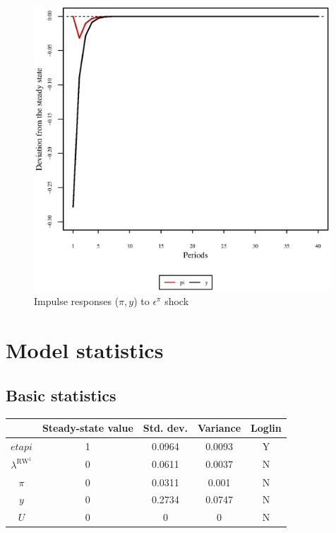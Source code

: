 \begin{figure}[h]
\centering
\begin{minipage}{0.5\textwidth}
\vspace*{-3em}
\centering
\includegraphics[width=0.99\textwidth, scale=0.55]{plots/plot_30.eps}
\caption{Impulse responses ($\pi, y$) to $\epsilon^{\pi}$ shock}
\end{minipage}
\end{figure}
\section{Model statistics}

\subsection{Basic statistics}

\begin{tabular}{c|c|c|c|c|}
  & Steady-state value & Std. dev. & Variance & Loglin\\
\hline
${e\!t\!a\!p\!i}$ & 1 & 0.0964 & 0.0093 & Y    \\
$\lambda^{\mathrm{RW}^{\mathrm{1}}}$ & 0 & 0.0611 & 0.0037 & N    \\
$\pi$ & 0 & 0.0311 & 0.001 & N    \\
$y$ & 0 & 0.2734 & 0.0747 & N    \\
$U$ & 0 & 0 & 0 & N    \\
\hline
\end{tabular}


